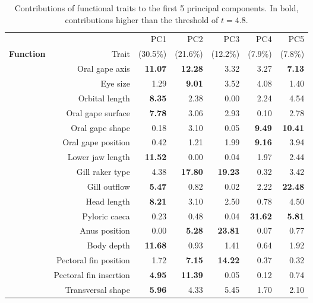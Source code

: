 \begin{table}[!htbp]
\centering
\caption[Contribution values of functional traits to the first five principal components]{Contributions of functional traits to the first 5 principal components. In bold, contributions higher than the threshold of $t =4.8$.}
\label{table:cont_abs}
\begin{adjustbox}{max width=1.1\textwidth,center}
\begin{tabular}{>{\bfseries}crrrrrr}
  \toprule
  &  & PC1 & PC2 & PC3 & PC4 & PC5 \\ 
 Function & Trait & (30.5\%) & (21.6\%) & (12.2\%) & (7.9\%) & (7.8\%) \\ 
  \midrule
  \multirow{13}{*}{Feeding} &Oral gape axis & \textbf{11.07} & \textbf{12.28} & 3.32 & 3.27 & \textbf{7.13} \\ 
  &Eye size & 1.29 & \textbf{9.01} & 3.52 & 4.08 & 1.40 \\ 
  &Orbital length & \textbf{8.35} & 2.38 & 0.00 & 2.24 & 4.54 \\ 
  &Oral gape surface & \textbf{7.78} & 3.06 & 2.93 & 0.10 & 2.78 \\ 
  &Oral gape shape & 0.18 & 3.10 & 0.05 & \textbf{9.49} & \textbf{10.41} \\ 
  &Oral gape position & 0.42 & 1.21 & 1.99 & \textbf{9.16} & 3.94 \\ 
  &Lower jaw length & \textbf{11.52} & 0.00 & 0.04 & 1.97 & 2.44 \\ 
  &Gill raker type & 4.38 & \textbf{17.80} & \textbf{19.23} & 0.32 & 3.42 \\ 
  &Gill outflow & \textbf{5.47} & 0.82 & 0.02 & 2.22 & \textbf{22.48} \\ 
  &Head length & \textbf{8.21} & 3.10 & 2.50 & 0.78 & 4.50 \\ 
  &Pyloric caeca & 0.23 & 0.48 & 0.04 & \textbf{31.62} & \textbf{5.81} \\ 
  &Anus position & 0.00 & \textbf{5.28} & \textbf{23.81} & 0.07 & 0.77 \\ 
   \midrule
   \multirow{6}{*}{Locomotion} & Body depth & \textbf{11.68} & 0.93 & 1.41 & 0.64 & 1.92 \\ 
  &Pectoral fin position & 1.72 & \textbf{7.15} & \textbf{14.22} & 0.37 & 0.32 \\ 
  &Pectoral fin insertion & \textbf{4.95} & \textbf{11.39} & 0.05 & 0.12 & 0.74 \\ 
  &Transversal shape & \textbf{5.96} & 4.33 & 5.45 & 1.70 & 2.10 \\ 

\end{tabular}
\end{adjustbox}
\end{table}
